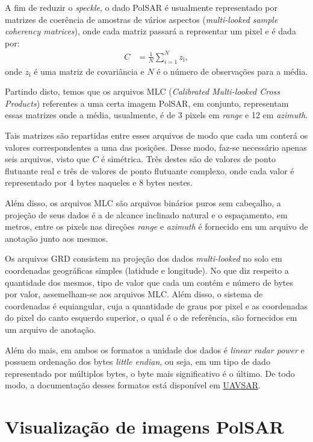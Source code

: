 \documentclass[12pt]{article}
\begin{document}
A fim de reduzir o \textit{speckle}\cite{Deng17}, o dado PolSAR é usualmente representado por matrizes de coerência de amostras de vários aspectos (\textit{multi-looked sample coherency matrices}), onde cada matriz passará a representar um pixel e é dada por:
\begin{align*}
C &= \frac{1}{N}\sum_{i = 1}^{N} z_\text{i},
\end{align*}
onde $z_\text{i}$ é uma matriz de covariância e $N$ é o número de observações para a média.

Partindo disto, temos que os arquivos MLC (\textit{Calibrated Multi-looked Cross Products}) referentes a uma certa imagem PolSAR, em conjunto, representam essas matrizes onde a média, usualmente, é de 3 pixels em \textit{range} e 12 em \textit{azimuth}. 

Tais matrizes são repartidas entre esses arquivos de modo que cada um conterá os valores correspondentes a uma das posições. Desse modo, faz-se necessário apenas seis arquivos, visto que $C$ é simétrica. Três destes são de valores de ponto flutuante real e três de valores de ponto flutuante complexo, onde cada valor é representado por 4 bytes naqueles e 8 bytes nestes.

Além disso, os arquivos MLC são arquivos binários puros sem cabeçalho, a projeção de seus dados é a de alcance inclinado natural e o espaçamento, em metros, entre os pixels nas direções \textit{range} e \textit{azimuth} é fornecido em um arquivo de anotação junto aos mesmos.

Os arquivos GRD consistem na projeção dos dados \textit{multi-looked} no solo em coordenadas geográficas simples (latidude e longitude). No que diz respeito a quantidade dos mesmos, tipo de valor que cada um contém e número de bytes por valor, assemelham-se aos arquivos MLC. Além disso, o sistema de coordenadas é equiangular, cuja a quantidade de graus por pixel e as coordenadas do pixel do canto esquerdo superior, o qual é o de referência, são fornecidos em um arquivo de anotação.

Além do mais, em ambos os formatos a unidade dos dados é \textit{linear radar power} e possuem ordenação dos bytes \textit{little endian}, ou seja, em um tipo de dado representado por múltiplos bytes, o byte mais significativo é o último. De todo modo, a documentação desses formatos está disponível em \href{https://uavsar.jpl.nasa.gov/science/documents/polsar-format.html}{UAVSAR}.

\section{Visualização de imagens PolSAR}
\end{document}
